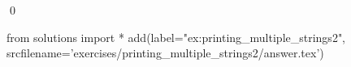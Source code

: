 
\begin{ex} 
  \label{ex:printing_multiple_strings2}
  
  \qed
\end{ex} 
\begin{python0}
from solutions import *
add(label="ex:printing_multiple_strings2",
    srcfilename='exercises/printing_multiple_strings2/answer.tex') 
\end{python0}

